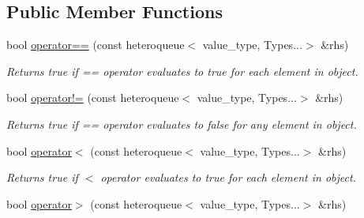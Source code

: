 \subsection*{Public Member Functions}
\begin{DoxyCompactItemize}
\item 
\hypertarget{classheterogeneous_1_1heteroqueue_3_01_t_00_01_types_8_8_8_4_ab3c5d13590e42409aa467301fcb015ef}{}bool \hyperlink{classheterogeneous_1_1heteroqueue_3_01_t_00_01_types_8_8_8_4_ab3c5d13590e42409aa467301fcb015ef}{operator==} (const heteroqueue$<$ value\+\_\+type, Types...$>$ \&rhs)\label{classheterogeneous_1_1heteroqueue_3_01_t_00_01_types_8_8_8_4_ab3c5d13590e42409aa467301fcb015ef}

\begin{DoxyCompactList}\small\item\em Returns true if == operator evaluates to true for each element in object. \end{DoxyCompactList}\item 
\hypertarget{classheterogeneous_1_1heteroqueue_3_01_t_00_01_types_8_8_8_4_a7f1bc9a231105b709e853e5880b3798d}{}bool \hyperlink{classheterogeneous_1_1heteroqueue_3_01_t_00_01_types_8_8_8_4_a7f1bc9a231105b709e853e5880b3798d}{operator!=} (const heteroqueue$<$ value\+\_\+type, Types...$>$ \&rhs)\label{classheterogeneous_1_1heteroqueue_3_01_t_00_01_types_8_8_8_4_a7f1bc9a231105b709e853e5880b3798d}

\begin{DoxyCompactList}\small\item\em Returns true if == operator evaluates to false for any element in object. \end{DoxyCompactList}\item 
\hypertarget{classheterogeneous_1_1heteroqueue_3_01_t_00_01_types_8_8_8_4_a9664f15cf0eb42dbb099aea3a2950864}{}bool \hyperlink{classheterogeneous_1_1heteroqueue_3_01_t_00_01_types_8_8_8_4_a9664f15cf0eb42dbb099aea3a2950864}{operator$<$} (const heteroqueue$<$ value\+\_\+type, Types...$>$ \&rhs)\label{classheterogeneous_1_1heteroqueue_3_01_t_00_01_types_8_8_8_4_a9664f15cf0eb42dbb099aea3a2950864}

\begin{DoxyCompactList}\small\item\em Returns true if $<$ operator evaluates to true for each element in object. \end{DoxyCompactList}\item 
\hypertarget{classheterogeneous_1_1heteroqueue_3_01_t_00_01_types_8_8_8_4_a10e114273d2247f4cc19564c8b982be5}{}bool \hyperlink{classheterogeneous_1_1heteroqueue_3_01_t_00_01_types_8_8_8_4_a10e114273d2247f4cc19564c8b982be5}{operator$>$} (const heteroqueue$<$ value\+\_\+type, Types...$>$ \&rhs)\label{classheterogeneous_1_1heteroqueue_3_01_t_00_01_types_8_8_8_4_a10e114273d2247f4cc19564c8b982be5}


\end{DoxyCompactItemize}
